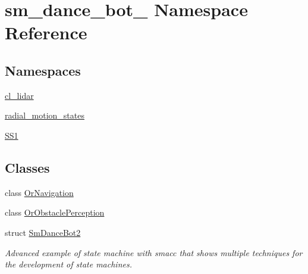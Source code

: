 \hypertarget{namespacesm__dance__bot__2}{}\section{sm\+\_\+dance\+\_\+bot\+\_ Namespace Reference}
\label{namespacesm__dance__bot__2}
\subsection*{Namespaces}
\begin{DoxyCompactItemize}
\item 
 \hyperlink{namespacesm__dance__bot__2_1_1cl__lidar}{cl\+\_\+lidar}
\item 
 \hyperlink{namespacesm__dance__bot__2_1_1radial__motion__states}{radial\+\_\+motion\+\_\+states}
\item 
 \hyperlink{namespacesm__dance__bot__2_1_1SS1}{S\+S1}
\end{DoxyCompactItemize}
\subsection*{Classes}
\begin{DoxyCompactItemize}
\item 
class \hyperlink{classsm__dance__bot__2_1_1OrNavigation}{Or\+Navigation}
\item 
class \hyperlink{classsm__dance__bot__2_1_1OrObstaclePerception}{Or\+Obstacle\+Perception}
\item 
struct \hyperlink{structsm__dance__bot__2_1_1SmDanceBot2}{Sm\+Dance\+Bot2}
\begin{DoxyCompactList}\small\item\em Advanced example of state machine with smacc that shows multiple techniques for the development of state machines. \end{DoxyCompactList}\end{DoxyCompactItemize}
